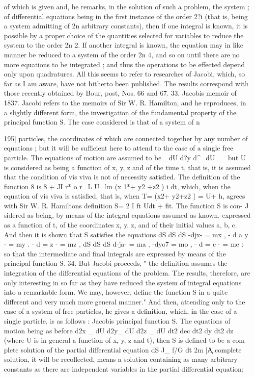 \documentclass[11pt,a4paper]{book}
\begin{document}
of which is given and, he remarks, in the solution of such a problem, the system
;
of differential equations being in the first instance of the order 2?i (that is, being
a system admitting of 2n arbitrary constants), then if one integral is known, it is
possible by a proper choice of the quantities selected for variables to reduce the system
to the order 2n 2. If another integral is known, the equation may in like manner
be reduced to a system of the order 2n 4, and so on until there are no more
equations to be integrated ; and thus the operations to be effected depend only upon
quadratures. All this seems to refer to researches of Jacobi, which, so far as I am
aware, have not hitherto been published. The results correspond with those recently
obtained by Bour, post, Nos. 66 and 67.
33. Jacobis memoir of 1837. Jacobi refers to the memoirs of Sir W. R. Hamilton,
and he reproduces, in a slightly different form, the investigation of the fundamental
property of the principal function S. The case considered is that of a system of n



195]
particles, the coordinates of which are connected together by any number of equations ;
but it will be sufficient here to attend to the case of a single free particle. The
equations of motion are assumed to be
_dU
d?y d^_dU_
~
but U is considered as being a function of x, y, z and of the time t, that is, it is
assumed that the condition of vis viva is not of necessity satisfied. The definition of
the function 8 is
8 + JI r* o r \ L U=lm (x 1*+ y2 +z2 ) i dt,
which, when the equation of vis viva is satisfied, that is, when
T= \m(x2+ y2+z2
)
= U+
h,
agrees with Sir W. R. Hamiltons definition S= 2 I ft Udt + fit. The function S is con-
J
sidered as being, by means of the integral equations assumed as known, expressed as
a function of t, of the coordinates x, y, z, and of their initial values a, b, c. And
then it is shown that S satisfies the equations
dS dS dS
-djx- = mx , - d a y - = my . - d = z - = mz ,
dS dS dS
d-ja- = ma , -dyo7 = mo , - d = c - = me :
so that the intermediate and final integrals are expressed by means of the principal
function S.
34. But Jacobi proceeds, " the definition assumes the integration of the differential
equations of the problem. The results, therefore, are only interesting in so far as they
have reduced the system of integral equations into a remarkable form. We may,
however, define the function S in a quite different and very much more general manner."
And then, attending only to the case of a system of free particles, he gives a definition,
which, in the case of a single particle, is as follows :
Jacobis principal function S. The equations of motion being as before
d2x _ dU d2y_ dU d2z _ dU
dt2 dec dt2 dy dt2 dz
(where U is in general a function of x, y, z and t), then S is defined to be a com
plete solution of the partial differential equation
dS
J_ f/G
dt 2m |\c
A
complete solution, it will be recollected, means a solution containing as many
arbitrary constants as there are independent variables in the partial differential equation;
\end{document}

